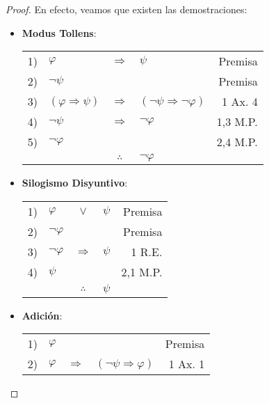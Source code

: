 \documentclass[12pt]{report}
\theoremstyle{largebreak}
\begin{document}
    \begin{proof}
        En efecto, veamos que existen las demostraciones:
        \begin{itemize}
            \item \textbf{Modus Tollens}:
            \begin{center}
                \begin{tabular}{l l c l r}
                    1) & $\varphi$ & $\Rightarrow$ & $\psi$ & Premisa \\
                    2) & $\neg\psi$ &  &  & Premisa \\
                    3) & $(\varphi\Rightarrow\psi)$ & $\Rightarrow$ & $(\neg\psi\Rightarrow\neg\varphi)$ & 1 Ax. 4 \\
                    4) & $\neg\psi$ & $\Rightarrow$ & $\neg\varphi$ & 1,3 M.P. \\
                    5) & $\neg\varphi$ &  &  & 2,4 M.P. \\
                    \hline
                    & & $\therefore$ & $\neg\varphi$ & \\
                \end{tabular}
            \end{center}
            \item \textbf{Silogismo Disyuntivo}:
            \begin{center}
                \begin{tabular}{l l c l r}
                    1) & $\varphi$ & $\lor$ & $\psi$ & Premisa \\
                    2) & $\neg\varphi$ &  &  & Premisa \\
                    3) & $\neg\varphi$ & $\Rightarrow$ & $\psi$ & 1 R.E.\\
                    4) & $\psi$ &  &  & 2,1 M.P. \\
                    \hline
                    & & $\therefore$ & $\psi$ & \\
                \end{tabular}
            \end{center}
            \item \textbf{Adición}:
            \begin{center}
                \begin{tabular}{l l c l r}
                    1) & $\varphi$ &  &  & Premisa \\
                    2) & $\varphi$ & $\Rightarrow$ & $(\neg\psi\Rightarrow\varphi)$ & 1 Ax. 1 \\

\end{tabular}
\end{center}
\end{itemize}
\end{proof}
\end{document}
